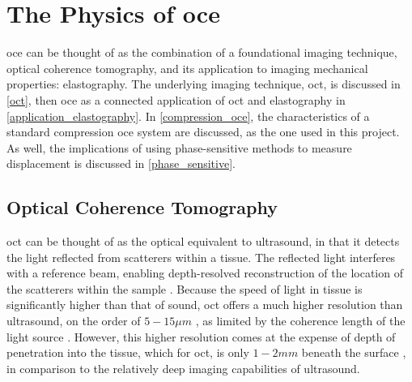 \chapter{The Physics of \ac{oce}}\label{oce}

\ac{oce} can be thought of as the combination of a foundational imaging technique, optical coherence tomography, and its application to imaging mechanical properties: elastography. The underlying imaging technique, \ac{oct}, is discussed in \autoref{oct}, then \ac{oce} as a connected application of \ac{oct} and elastography in \autoref{application_elastography}. In \autoref{compression_oce}, the characteristics of a standard compression \ac{oce} system are discussed, as the one used in this project. As well, the implications of using phase-sensitive methods to measure displacement is discussed in \autoref{phase_sensitive}.

\section{Optical Coherence Tomography}\label{oct}
\ac{oct} can be thought of as the optical equivalent to ultrasound, in that it detects the light reflected from scatterers within a tissue. The reflected light interferes with a reference beam, enabling depth-resolved reconstruction of the location of the scatterers within the sample \cite{chin_parametric_2016}. Because the speed of light in tissue is significantly higher than that of sound, \ac{oct} offers a much higher resolution than ultrasound, on the order of $5-15 \mu m$ \cite{kennedy_emergence_2017}, as limited by the coherence length of the light source \cite{huang_optical_1991}. However, this higher resolution comes at the expense of depth of penetration into the tissue, which for \ac{oct}, is only $1-2mm$ beneath the surface \cite{schmitt_optical_1999}, in comparison to the relatively deep imaging capabilities of ultrasound.


